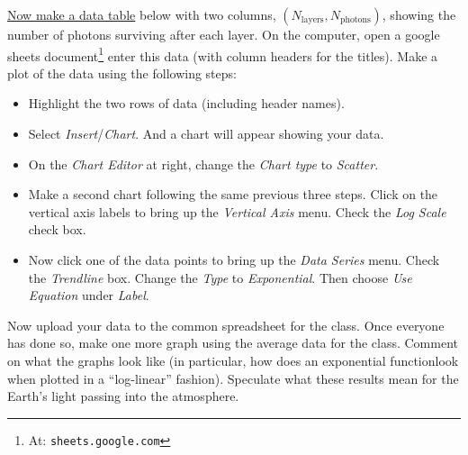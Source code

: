 \noindent \underline{Now make a data table} below with two columns, $(N_\text{layers}, N_\text{photons})$, showing the number of photons surviving after each layer.  On the computer, open a google sheets document\footnote{At: \texttt{sheets.google.com}} enter this data (with column headers for the titles).  Make a plot of the data using the following steps:
	\begin{itemize}
	\item Highlight the two rows of data (including header names).
	\item Select {\em Insert}/{\em Chart}. And a chart will appear showing your data.
	\item On the {\em Chart Editor} at right, change the {\em Chart type} to {\em Scatter}.
	\item Make a second chart following the same previous three steps. Click on the vertical axis labels to bring up the {\em Vertical Axis} menu. Check the {\em Log Scale} check box.
	\item Now click one of the data points to bring up the {\em Data Series} menu. Check the {\em Trendline} box. Change the {\em Type} to {\em Exponential}. Then choose {\em Use Equation} under {\em Label}.
	\end{itemize}
Now upload your data to the common spreadsheet for the class.  Once everyone has done so, make one more graph using the average data for the class.  Comment on what the graphs look like (in particular, how does an exponential functionlook when plotted in a ``log-linear'' fashion).  Speculate what these results mean for the Earth's light passing into the atmosphere.

\newpage

